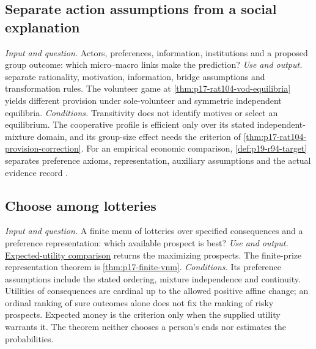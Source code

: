 \subsection{Separate action assumptions from a social explanation}
\label{sec:p14-finder-social-models}
\textit{Input and question.} Actors, preferences, information, institutions
and a proposed group outcome: which micro--macro links make the prediction?
\textit{Use and output.}  separate rationality, motivation, information,
bridge assumptions and transformation rules. The volunteer game at
\cref{thm:p17-rat104-vod-equilibria} yields different provision under
sole-volunteer and symmetric independent equilibria.
\textit{Conditions.} Transitivity does not identify motives or select an
equilibrium. The cooperative profile is efficient only over its stated
independent-mixture domain, and its group-size effect needs the criterion
of \cref{thm:p17-rat104-provision-correction}. For an empirical economic
comparison, \cref{def:p19-r94-target} separates preference axioms,
representation, auxiliary assumptions and the actual evidence record
\cite{Raub2021RationalChoiceSocialSciences,DhamiAlNowaihi2021Economics}.

\subsection{Choose among lotteries}
\label{sec:p14-finder-choice}
\textit{Input and question.} A finite menu of lotteries over specified
consequences and a preference representation: which available prospect is best?
\textit{Use and output.}
\hyperref[def:p17-expected-utility-choice]{Expected-utility comparison}
returns the maximizing prospects. The finite-prize representation theorem
is \cref{thm:p17-finite-vnm}.
\textit{Conditions.} Its preference assumptions include the stated ordering,
mixture independence and continuity. Utilities of consequences are cardinal
up to the allowed positive affine change; an ordinal ranking of sure outcomes
alone does not fix the ranking of risky prospects. Expected money is the
criterion only when the supplied utility warrants it. The theorem neither
chooses a person's ends nor estimates the probabilities.

